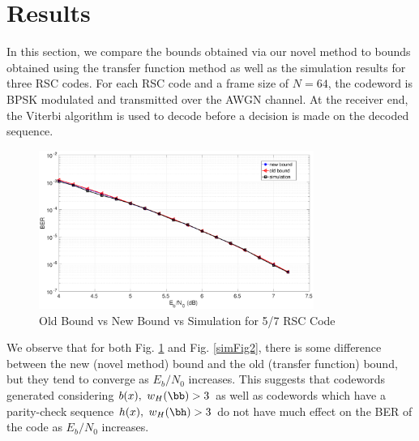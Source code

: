 \section{Results}
\label{sec6}
In this section, we compare the bounds obtained via our novel method to bounds obtained using the transfer function method as well as the simulation results for three RSC codes. For each RSC code and a frame size of $N=64$, the codeword is BPSK modulated and transmitted over the AWGN channel. At the receiver end, the Viterbi algorithm is used to decode before a decision is made on the decoded sequence.

\begin{figure}[h!]
\centering
		\includegraphics[width=0.8\textwidth]{./Images/RSC_5_7_lower_weights.eps}
		\caption{Old Bound vs New Bound vs Simulation for 5/7 RSC Code}
		\label{simFig1}
		\end{figure}
We observe that for both Fig. \ref{simFig1} and Fig. \ref{simFig2}, there is some difference between the new (novel method) bound and the old (transfer function) bound, but they tend to converge as $E_b/N_0$ increases. This suggests that codewords generated considering $b(x),~w_H(\bb)>3$ as well as codewords which have a parity-check sequence $h(x),~w_H(\bh)>3$ do not have much effect on the BER of the code as $E_b/N_0$ increases.


